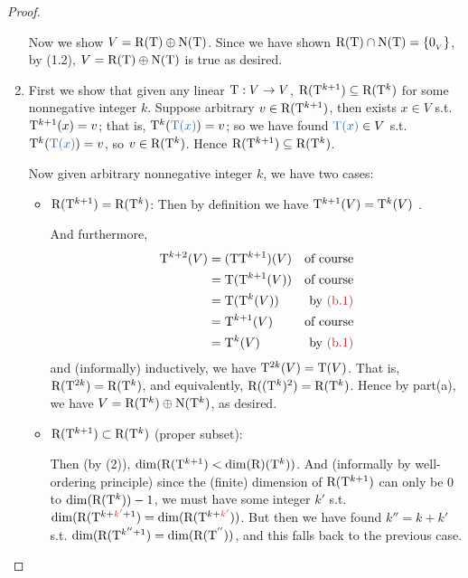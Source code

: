 \begin{proof}
\begin{enumerate}
Now we show \(V = \mathrm{R(T)} \oplus \mathrm{N(T)}\).
Since we have shown \(\mathrm{R(T)} \cap \mathrm{N(T)} = \{ 0_{_V} \}\), by (1.2), \(V = \mathrm{R(T)} \oplus \mathrm{N(T)}\) is true as desired.

\item
First we show that given any linear \(\mathrm{T} : V \to V\), \(\mathrm{R}(\mathrm{T}^{k + 1}) \subseteq \mathrm{R}(\mathrm{T}^k)\) for some nonnegative integer \(k\).
Suppose arbitrary \(v \in \mathrm{R}(\mathrm{T}^{k + 1})\), then exists \(x \in V\) s.t. \(\mathrm{T}^{k + 1}(x) = v\);
that is, \(\T^k(\BLUE{\T(x)}) = v\);
so we have found \(\BLUE{\T(x)} \in V\) s.t. \(\T^k(\BLUE{\T(x)}) = v\), so \(v \in \mathrm{R}(\mathrm{T}^k)\).
Hence \(\mathrm{R}(\mathrm{T}^{k + 1}) \subseteq \mathrm{R}(\mathrm{T}^k)\).

Now given arbitrary nonnegative integer \(k\), we have two cases:
\begin{itemize}
    \item \(\mathrm{R}(\mathrm{T}^{k + 1}) = \mathrm{R}(\mathrm{T}^k)\): Then by definition we have \(\mathrm{T}^{k + 1}(V) = \mathrm{T}^k(V)\) .
    
    And furthermore,
    \begin{align*}
        \T^{k + 2}(V) & = (\T \T^{k+1})(V) & \text{of course} \\
                      & = \T(\T^{k + 1}(V)) & \text{of course} \\
                      & = \T(\T^k(V)) & \text{by \MAROON{(b.1)}} \\
                      & = \T^{k + 1}(V) & \text{of course} \\
                      & = \T^k(V) & \text{by \MAROON{(b.1)}}
    \end{align*}
    and (informally) inductively, we have \(\mathrm{T}^{2k}(V) = \mathrm{T}(V)\).
    That is, \(\mathrm{R}(\mathrm{T}^{2k}) = \mathrm{R}(\mathrm{T}^k)\), and equivalently, \(\mathrm{R}((\mathrm{T}^k)^2) = \mathrm{R}(\mathrm{T}^k)\).
    Hence by part(a), we have \(V = \mathrm{R}(\mathrm{T}^k) \oplus \mathrm{N}(\mathrm{T}^k)\), as desired.
    
    \item \(\mathrm{R}(\mathrm{T}^{k + 1}) \subset \mathrm{R}(\mathrm{T}^k)\) (proper subset):

    Then (by (2)), \(\dim(\mathrm{R}(\mathrm{T}^{k + 1}) < \dim(\mathrm{R})(\mathrm{T}^k))\).
    And (informally by well-ordering principle) since the (finite) dimension of \(\mathrm{R}(\mathrm{T}^{k + 1})\) can only be \(0\) to \(\dim(\mathrm{R}(\mathrm{T}^k)) - 1\), we must have some integer \(k'\) s.t. \(\dim(\RANGE(\T^{k + \RED{k'} + 1}) = \dim(\RANGE(\T^{k + \RED{k'}}))\).
    But then we have found \(k'' = k + k'\) s.t. \(\dim(\mathrm{R}(\mathrm{T}^{k'' + 1}) = \dim(\mathrm{R}(\mathrm{T}^{''}))\), and this falls back to the previous case.
\end{itemize}
\end{enumerate}
\end{proof}

